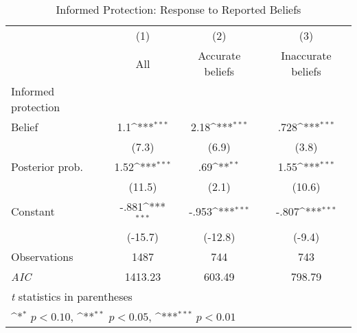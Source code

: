 \begin{table}[htbp]\centering
\def\sym#1{\ifmmode^{#1}\else\(^{#1}\)\fi}
\caption{Informed Protection: Response to Reported Beliefs}
\begin{tabular}{l*{3}{c}}
\hline\hline
                &\multicolumn{1}{c}{(1)}&\multicolumn{1}{c}{(2)}&\multicolumn{1}{c}{(3)}\\
                &\multicolumn{1}{c}{All}&\multicolumn{1}{c}{Accurate beliefs}&\multicolumn{1}{c}{Inaccurate beliefs}\\
\hline
Informed protection&                  &                  &                  \\
Belief          &      1.1\sym{***}&     2.18\sym{***}&     .728\sym{***}\\
                &    (7.3)         &    (6.9)         &    (3.8)         \\
Posterior prob. &     1.52\sym{***}&      .69\sym{**} &     1.55\sym{***}\\
                &   (11.5)         &    (2.1)         &   (10.6)         \\
Constant        &    -.881\sym{***}&    -.953\sym{***}&    -.807\sym{***}\\
                &  (-15.7)         &  (-12.8)         &   (-9.4)         \\
\hline
Observations    &     1487         &      744         &      743         \\
\textit{AIC}    &  1413.23         &   603.49         &   798.79         \\
\hline\hline
\multicolumn{4}{l}{\footnotesize \textit{t} statistics in parentheses}\\
\multicolumn{4}{l}{\footnotesize \sym{*} \(p<0.10\), \sym{**} \(p<0.05\), \sym{***} \(p<0.01\)}\\
\end{tabular}
\end{table}
